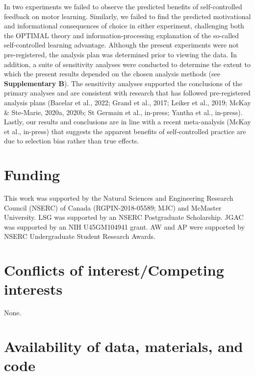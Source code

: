 \documentclass[
  doc, donotrepeattitle,floatsintext]{apa7}
\begin{document}
In two experiments we failed to observe the predicted benefits of self-controlled feedback on motor learning. Similarly, we failed to find the predicted motivational and informational consequences of choice in either experiment, challenging both the OPTIMAL theory and information-processing explanation of the so-called self-controlled learning advantage. Although the present experiments were not pre-registered, the analysis plan was determined prior to viewing the data. In addition, a suite of sensitivity analyses were conducted to determine the extent to which the present results depended on the chosen analysis methods (see \textbf{Supplementary B}). The sensitivity analyses supported the conclusions of the primary analyses and are consistent with research that has followed pre-registered analysis plans (Bacelar et al., 2022; Grand et al., 2017; Leiker et al., 2019; McKay \& Ste-Marie, 2020a, 2020b; St Germain et al., in-press; Yantha et al., in-press). Lastly, our results and conclusions are in line with a recent meta-analysis (McKay et al., in-press) that suggests the apparent benefits of self-controlled practice are due to selection bias rather than true effects.

\vspace{2.5ex}

\hypertarget{funding}{%
\section{Funding}\label{funding}}

This work was supported by the Natural Sciences and Engineering Research Council (NSERC) of Canada (RGPIN-2018-05589; MJC) and McMaster University. LSG was supported by an NSERC Postgraduate Scholarship. JGAC was supported by an NIH U45GM104941 grant. AW and AP were supported by NSERC Undergraduate Student Research Awards.

\hypertarget{conflicts-of-interestcompeting-interests}{%
\section{Conflicts of interest/Competing interests}\label{conflicts-of-interestcompeting-interests}}

None.

\hypertarget{availability-of-data-materials-and-code}{%
\section{Availability of data, materials, and code}\label{availability-of-data-materials-and-code}}
\end{document}
